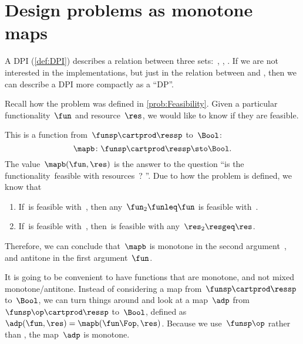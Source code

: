 
\section[DPs as monotone maps]{Design problems as monotone maps}
\label{sec:dpdefinition}


A DPI (\cref{def:DPI}) describes a relation between three sets:~\funsp, \ressp, \impsp.
If we are not interested in the implementations, but just in the relation between \funsp and \ressp, then we can describe a DPI more compactly as a ``DP''\@.

Recall how the problem \Feasibility was defined in \cref{prob:Feasibility}.
Given a particular functionality~$\fun$ and resource~$\res$, we would like to know if they are feasible.

This is a function from~$\funsp \cartprod \ressp$ to~$\Bool$:
%
\begin{equation}
	\mapb\colon \funsp \cartprod \ressp \sto \Bool.
\end{equation}
%
The value~$\mapb(\fun, \res)$ is the answer to the question ``is the functionality~\fun feasible with resources~\res?
''.
Due to how the problem is defined, we know that%
\begin{enumerate}
	\item If~\fun is feasible with~\res, then any~$\fun_2 \funleq \fun$ is feasible with~\res.
	\item If~\fun is feasible with~\res, then~\fun is feasible with any~$\res_2 \resgeq \res$.
\end{enumerate}
Therefore, we can conclude that~$\mapb$ is monotone in the second argument~\res, and antitone in the first argument~$\fun$.

It is going to be convenient to have functions that are monotone, and not mixed monotone/antitone.
Instead of considering a map from~$\funsp \cartprod \ressp$ to~$\Bool$, we can turn things around and look at a map~$\adp$ from~$\funsp\op \cartprod \ressp$ to~$\Bool$, defined as~$\adp(\fun,\res) = \mapb(\fun\Fop,\res)$.
Because we use~$\funsp\op$ rather than \funsp, the map~$\adp$ is monotone.


